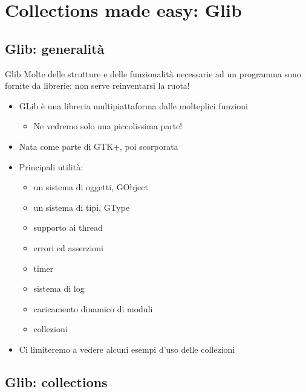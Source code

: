 \documentclass{beamer}
\begin{document}
\section{Collections made easy: Glib}

\subsection{Glib: generalità}

\begin{frame}{Glib}
Molte delle strutture e delle funzionalità necessarie ad un programma sono fornite da librerie: non serve reinventarsi la ruota!
\begin{itemize}
 \item GLib è una libreria multipiattaforma dalle molteplici funzioni
  \begin{itemize}
    \item Ne vedremo solo una piccolissima parte!
  \end{itemize}
 \item Nata come parte di GTK+, poi scorporata
 \item Principali utilità:
  \begin{itemize}
    \item un sistema di oggetti, GObject
    \item un sistema di tipi, GType
    \item supporto ai thread
    \item errori ed asserzioni
    \item timer
    \item sistema di log
    \item caricamento dinamico di moduli
    \item collezioni
  \end{itemize}
 \item Ci limiteremo a vedere alcuni esempi d'uso delle collezioni
\end{itemize}
\end{frame}

\subsection{Glib: collections}
\end{document}
